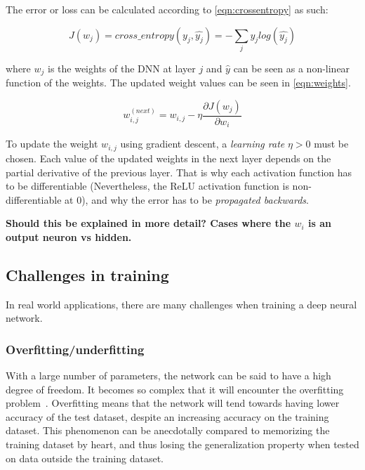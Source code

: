\documentclass[oneside, english, bibtex]{kththesis}
\begin{document}
The error or loss can be calculated according to \autoref{eqn:crossentropy} as such:

\begin{equation}
    J(w_j) = cross\_entropy(y_j,\hat{y_j}) = - \sum_{j} y_j log(\hat{y_j})
    \label{eqn:jacobian}
\end{equation}


where $w_j$ is the weights of the DNN at layer $j$ and $\hat{y}$ can be seen as a non-linear function of the weights. The updated weight values can be seen in \autoref{eqn:weights}.

\begin{equation}
    w_{i,j}^{(next)} = w_{i,j} - \eta \frac{\partial J(w_j)}{\partial w_i}
    \label{eqn:weights}
\end{equation}

To update the weight $w_{i,j}$ using gradient descent, a \textit{learning rate} $\eta > 0$ must be chosen. Each value of the updated weights in the next layer depends on the partial derivative of the previous layer. That is why each activation function has to be differentiable (Nevertheless, the ReLU activation function is non-differentiable at 0), and why the error has to be \textit{propagated backwards}.

\textbf{Should this be explained in more detail? Cases where the $w_i$ is an output neuron vs hidden. }

\subsection{Challenges in training}

In real world applications, there are many challenges when training a deep neural network.

\subsubsection{Overfitting/underfitting}

With a large number of parameters, the network can be said to have a high degree of freedom. It becomes so complex that it will encounter the overfitting problem~\cite{doi:10.1021/ci0342472}. Overfitting means that the network will tend towards having lower accuracy of the test dataset, despite an increasing accuracy on the training dataset. This phenomenon can be anecdotally compared to memorizing the training dataset by heart, and thus losing the generalization property when tested on data outside the training dataset.
\end{document}
